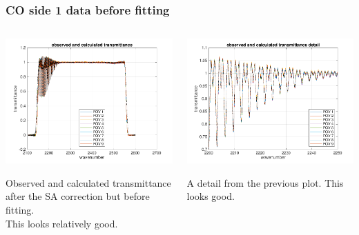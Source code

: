\documentclass[10pt]{beamer}
\begin{document}
\begin{frame}
\frametitle{CO side 1 data before fitting}
\begin{columns}[t]
\begin{column}{0.5\textwidth}  
  \begin{centering}
  \includegraphics[width=\textwidth]{01-13_pfh_s1_CO/spec_test2_all.png}
  \end{centering}\vspace{3mm}

Observed and calculated transmittance after the SA correction but
before fitting. \\ This looks relatively good.

\end{column}

\begin{column}{0.5\textwidth}
  \begin{centering}
  \includegraphics[width=\textwidth]{01-13_pfh_s1_CO/spec_test2_zoom.png}
  \end{centering}\vspace{3mm}

A detail from the previous plot.  This looks good.

\end{column}
\end{columns}
\end{frame}
\end{document}
